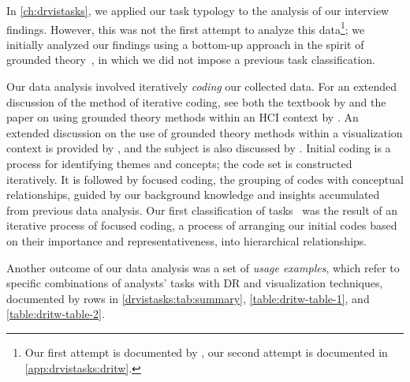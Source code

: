 In \autoref{ch:drvistasks}, we applied our task typology to the analysis of our interview findings.
However, this was not the first attempt to analyze this data\footnote{Our first attempt is documented by \citet{Sedlmair2012b}, our second attempt is documented in \autoref{app:drvistasks:dritw}.}; we initially analyzed our findings using a bottom-up approach in the spirit of grounded theory~\cite{Charmaz2006}, in which we did not impose a previous task classification. 


Our data analysis involved iteratively {\it coding} our collected data.
For an extended discussion of the method of iterative coding, see both the textbook by \citet{Charmaz2006} and the paper on using grounded theory methods within an \ac{HCI} context by \citet{Furniss2011}. 
An extended discussion on the use of grounded theory methods within a visualization context is provided by \citet{Isenberg2008}, and the subject is also discussed by \citet{Carpendale2008}. 
Initial coding is a process for identifying themes and concepts; the code set is constructed iteratively. 
It is followed by focused coding, the grouping of codes with conceptual relationships, guided by our background knowledge and insights accumulated from previous data analysis. 
Our first classification of tasks~\cite{Sedlmair2012b} was the result of an iterative process of focused coding, a process of arranging our initial codes based on their importance and representativeness, into hierarchical relationships.

Another outcome of our data analysis was a set of {\it usage examples}, which refer to specific combinations of analysts' tasks with \ac{DR} and visualization techniques, documented by rows in \autoref{drvistasks:tab:summary}, \autoref{table:dritw-table-1}, and \autoref{table:dritw-table-2}.

